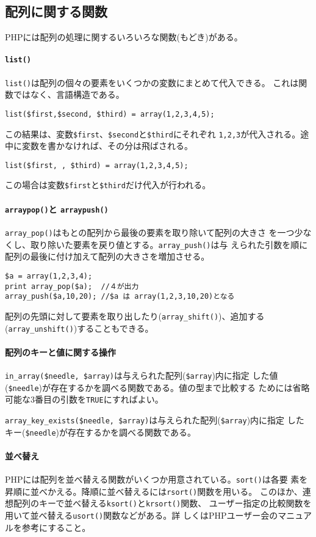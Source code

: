 \subsection{配列に関する関数}
PHPには配列の処理に関するいろいろな関数(もどき)がある。
\paragraph{\protect\texttt{list()}}
\texttt{list()}は配列の個々の要素をいくつかの変数にまとめて代入できる。
これは関数ではなく、言語構造である。
\begin{Verbatim}
list($first,$second, $third) = array(1,2,3,4,5);
\end{Verbatim}
この結果は、変数\Verb+$first+、\Verb+$second+と\Verb+$third+にそれぞれ
\texttt{1,2,3}が代入される。途中に変数を書かなければ、その分は飛ばされる。
\begin{Verbatim}
list($first, , $third) = array(1,2,3,4,5);
\end{Verbatim}
この場合は変数\Verb+$first+と\Verb+$third+だけ代入が行われる。
\paragraph{\protect\texttt{array\textunderscore pop()}と
\protect\texttt{array\textunderscore push()}}
\Verb+array_pop()+はもとの配列から最後の要素を取り除いて配列の大きさ
を一つ少なくし、取り除いた要素を戻り値とする。\Verb+array_push()+は与
えられた引数を順に配列の最後に付け加えて配列の大きさを増加させる。
\begin{Verbatim}
$a = array(1,2,3,4);
print array_pop($a);  //４が出力
array_push($a,10,20); //$a は array(1,2,3,10,20)となる
\end{Verbatim}
配列の先頭に対して要素を取り出したり(\Verb+array_shift()+)、追加する
(\Verb+array_unshift()+)することもできる。
\paragraph{配列のキーと値に関する操作}
\Verb+in_array($needle, $array)+は与えられた配列(\Verb+$array+)内に指定
した値(\Verb+$needle+)が存在するかを調べる関数である。値の型まで比較する
ためには省略可能な3番目の引数を\Verb+TRUE+にすればよい。

\Verb+array_key_exists($needle, $array)+は与えられた配列(\Verb+$array+)内に指定
したキー(\Verb+$needle+)が存在するかを調べる関数である。
\paragraph{並べ替え}
PHPには配列を並べ替える関数がいくつか用意されている。\Verb+sort()+は各要
素を昇順に並べかえる。降順に並べ替えるには\Verb+rsort()+関数を用いる。
このほか、連想配列のキーで並べ替える\Verb+ksort()+と\Verb+krsort()+関数、
ユーザー指定の比較関数を用いて並べ替える\Verb+usort()+関数などがある。詳
しくはPHPユーザー会のマニュアルを参考にすること。
